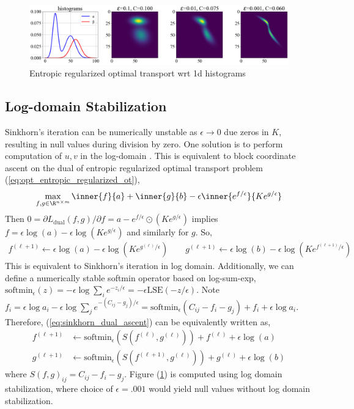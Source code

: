 \documentclass[11pt]{article}
\begin{document}
\begin{center} 
\begin{figure}[h!]
    \includegraphics[width=\textwidth]{assets/plt_sinkhorn_vary_epsilon} 
    \caption{Entropic regularized optimal transport wrt 1d histograms}
    \label{fig:plt_sinkhorn_vary_epsilon}
\end{figure}
\end{center} 

\subsection{Log-domain Stabilization}

Sinkhorn's iteration can be numerically unstable as $\epsilon\to 0$ due zeros in $K$, resulting in null values during division by zero. One solution is to perform computation of $u,v$ in the log-domain \cite{chizatScalingAlgorithmsUnbalanced2017, schmitzerStabilizedSparseScaling2019}. This is equivalent to block coordinate ascent on the dual of entropic regularized optimal transport problem (\ref{eq:opt_entropic_regularized_ot}),
\begin{align}
    \max_{f,g\in\R^{n\times m}} \inner{f}{a} + \inner{g}{b} - \epsilon\inner{e^{f/\epsilon}}{Ke^{g/\epsilon}}
\end{align}
Then $0 = \partial L_{\text{dual}}(f,g)/\partial f = a - e^{f/\epsilon} \odot (Ke^{g/\epsilon})$ implies $f = \epsilon \log(a) - \epsilon \log(Ke^{g/\epsilon})$ and similarly for $g$. So,
\begin{align}
    f^{(\ell+1)}
        \leftarrow \epsilon \log(a) - \epsilon\log(Ke^{g^{(\ell)}/\epsilon})
    \quad\quad
    g^{(\ell+1)}
        \leftarrow \epsilon \log(b) - \epsilon\log(Ke^{f^{(\ell+1)}/\epsilon})
    \label{eq:sinkhorn_dual_ascent}
\end{align}
This is equivalent to Sinkhorn's iteration in log domain. Additionally, we can define a numerically stable softmin operator based on log-sum-exp, $\text{softmin}_{\epsilon}(z) = - \epsilon \log \sum_{i} e^{-z_i/\epsilon} = -\epsilon \text{LSE}(-z/\epsilon)$. Note $f_i = \epsilon \log a_i - \epsilon \log \sum_j e^{-(C_{ij}-g_j)/\epsilon} =\text{softmin}_{\epsilon}(C_{ij}-f_i-g_j) + f_i +  \epsilon \log a_i$. Therefore, (\ref{eq:sinkhorn_dual_ascent}) can be equivalently written as,
\begin{align}
    f^{(\ell+1)}
        &\leftarrow \text{softmin}_{\epsilon} (S(f^{(\ell)}, g^{(\ell)})) + f^{(\ell)} + \epsilon \log(a) \\ 
    g^{(\ell+1)}
        &\leftarrow \text{softmin}_{\epsilon} (S(f^{(\ell+1)}, g^{(\ell)})) + g^{(\ell)} + \epsilon \log(b)
    \label{eq:sinkhorn_dual_ascent2}
\end{align}
where $S(f,g)_{ij} = C_{ij}-f_i-g_j$. Figure (\ref{fig:plt_sinkhorn_vary_epsilon}) is computed using log domain stabilization, where choice of $\epsilon=.001$ would yield null values without log domain stabilization.
 
\end{document}
